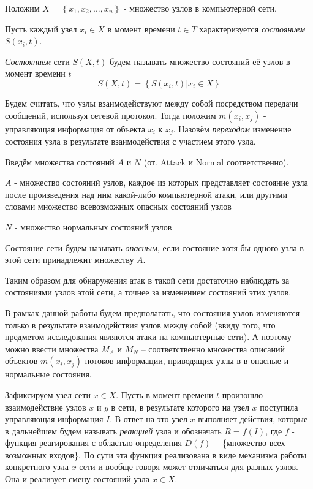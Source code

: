 \documentclass[12pt,a4paper]{article}
\begin{document}
Положим $X = \left\{x_1, x_2, ..., x_n\right\} $ - множество узлов в компьютерной сети.

Пусть каждый узел $x_i \in X$ в момент времени $t \in T$ характеризуется \textit{состоянием} $S(x_i, t)$.

\textit{Состоянием} сети $S(X, t)$ будем называть множество состояний её узлов в момент времени $t$
\begin{equation}
S(X, t) = \left\{S(x_i, t) | x_i \in X\right\}
\end{equation}


Будем считать, что узлы взаимодействуют между собой посредством передачи сообщений, используя сетевой протокол. Тогда положим $m(x_i, x_j)$ - управляющая информация от объекта $x_i$ к $x_j$. Назовём \textit{переходом} изменение состояния узла в результате взаимодействия с участием этого узла. 

Введём множества состояний $A$ и $N$ (от. Attack и Normal соответственно).

$A$ - множество состояний узлов, каждое из которых представляет состояние узла после произведения над ним какой-либо компьютерной атаки, или другими словами множество всевозможных опасных состояний узлов

$N$ - множество нормальных состояний узлов

Состояние сети будем называть \textit{опасным}, если состояние хотя бы одного узла в этой сети принадлежит множеству $A$.

Таким образом для обнаружения атак в такой сети достаточно наблюдать за состояниями узлов этой сети, а точнее за изменением состояний этих узлов. 

В рамках данной работы будем предполагать, что состояния узлов изменяются только в результате взаимодействия узлов между собой (ввиду того, что предметом исследования являются атаки на компьютерные сети). А поэтому можно ввести множества $M_A$ и $M_N$ -- соответственно множества описаний объектов $m(x_i, x_j)$ потоков информации, приводящих узлы в в опасные и нормальные состояния.


Зафиксируем узел сети $x \in X$. 
Пусть в момент времени $t$ произошло взаимодействие узлов $x$ и $y$ в сети, в результате которого на узел $x$ поступила управляющая информация $I$. В ответ на это узел $x$ выполняет действия, которые в дальнейшем будем называть \textit{реакцией} узла и обозначать $R = f(I)$, где $f$ - функция реагирования с областью определения $D(f)$~-~\{множество всех возможных входов\}. По сути эта функция реализована в виде механизма работы конкретного узла $x$ сети и вообще говоря может отличаться для разных узлов. Она и реализует смену состояний узла $x \in X$.
\end{document}
